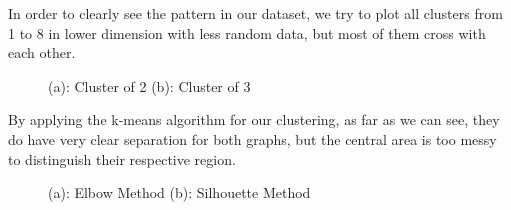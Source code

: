 \documentclass[11pt]{article} %
\begin{document}
\quad In order to clearly see the pattern in our dataset, we try to plot all clusters from 1 to 8 in lower dimension with less random data, but most of them cross with each other.

\begin{figure}[H]
    \centering
    \caption{(a): Cluster of 2  (b): Cluster of 3}
    \label{fig:foobar}
\end{figure}

\quad By applying the k-means algorithm for our clustering, as far as we can see, they do have very clear separation for both graphs, but the central area is too messy to distinguish their respective region.

\begin{figure}[H]
    \centering
    \caption{(a): Elbow Method  (b): Silhouette Method}
    \label{fig:foobar}
\end{figure}
\end{document}
